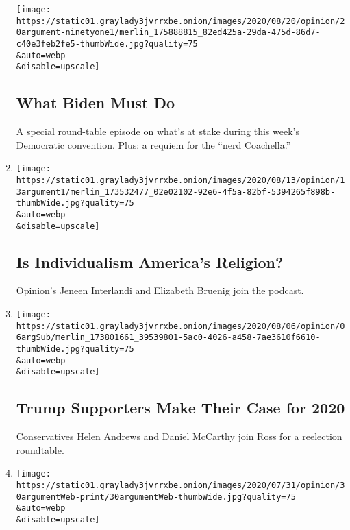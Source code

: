 \begin{enumerate}
  \texttt{[image: https://static01.graylady3jvrrxbe.onion/images/2020/08/20/opinion/20argument-ninetyone1/merlin\_175888815\_82ed425a-29da-475d-86d7-c40e3feb2fe5-thumbWide.jpg?quality=75\\\&auto=webp\\\&disable=upscale]}

  \hypertarget{what-biden-must-do}{%
  \subsection{What Biden Must Do}\label{what-biden-must-do}}

  A special round-table episode on what's at stake during this week's
  Democratic convention. Plus: a requiem for the ``nerd Coachella.''
\item
  \href{/2020/08/13/opinion/the-argument-coronavirus-catholic-covid.html}{}

  \texttt{[image: https://static01.graylady3jvrrxbe.onion/images/2020/08/13/opinion/13argument1/merlin\_173532477\_02e02102-92e6-4f5a-82bf-5394265f898b-thumbWide.jpg?quality=75\\\&auto=webp\\\&disable=upscale]}

  \hypertarget{is-individualism-americas-religion}{%
  \subsection{Is Individualism America's
  Religion?}\label{is-individualism-americas-religion}}

  Opinion's Jeneen Interlandi and Elizabeth Bruenig join the podcast.
\item
  \href{/2020/08/06/opinion/the-argument-trump-coronavirus-election.html}{}

  \texttt{[image: https://static01.graylady3jvrrxbe.onion/images/2020/08/06/opinion/06argSub/merlin\_173801661\_39539801-5ac0-4026-a458-7ae3610f6610-thumbWide.jpg?quality=75\\\&auto=webp\\\&disable=upscale]}

  \hypertarget{trump-supporters-make-their-case-for-2020}{%
  \subsection{Trump Supporters Make Their Case for
  2020}\label{trump-supporters-make-their-case-for-2020}}

  Conservatives Helen Andrews and Daniel McCarthy join Ross for a
  reelection roundtable.
\item
  \href{/2020/07/30/opinion/the-argument-authoritarianism-anne-applebaum.html}{}

  \texttt{[image: https://static01.graylady3jvrrxbe.onion/images/2020/07/31/opinion/30argumentWeb-print/30argumentWeb-thumbWide.jpg?quality=75\\\&auto=webp\\\&disable=upscale]}


\end{enumerate}
